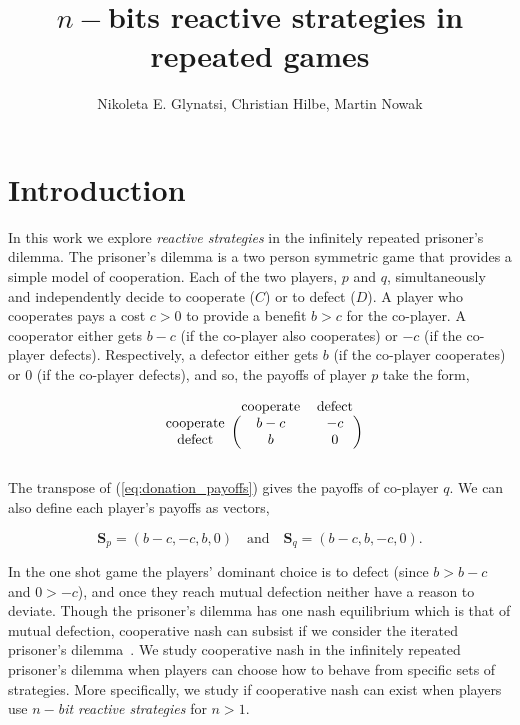 \documentclass{article}
\title{$n-$bits reactive strategies in repeated games}
\author{Nikoleta E. Glynatsi, Christian Hilbe, Martin Nowak}
\date{}
\theoremstyle{definition}
\begin{document}
\maketitle

\section{Introduction}

In this work we explore \textit{reactive strategies} in the infinitely repeated
prisoner's dilemma. The prisoner's dilemma is a two person symmetric game that
provides a simple model of cooperation. Each of the two players, \(p\) and
\(q\), simultaneously and independently decide to cooperate (\(C\)) or to defect
(\(D\)). A player who cooperates pays a cost \(c > 0\) to provide a benefit
\(b > c\) for the co-player. A cooperator either gets \(b - c\) (if the
co-player also cooperates) or \(-c\) (if the co-player defects). Respectively, a defector either gets
\(b\) (if the co-player cooperates) or 0 (if the co-player defects), and so,
the payoffs of player \(p\) take the form,

\begin{equation}\label{eq:donation_payoffs}
  \begin{blockarray}{ccc}
      & \text{cooperate} & \text{defect} \\
      \begin{block}{c(cc)}
          \text{cooperate} & b - c & -c \\
          \text{defect} & b & 0 \\
      \end{block}
  \end{blockarray}
\end{equation}

The transpose of (\ref{eq:donation_payoffs}) gives the payoffs of
co-player \(q\). We can also define each player's payoffs as vectors,

\begin{equation}\label{eq:vector_payoffs}
  \mathbf{S}_{p} = (b-c, -c, b, 0) \quad \textrm{and} \quad  \mathbf{S}_{q} = (b - c, b, -c, 0).
\end{equation}

In the one shot game the players' dominant choice is to defect (since $b > b -
c$ and $0 > -c$), and once they reach mutual defection neither have a reason to
deviate. Though the prisoner's dilemma has one nash equilibrium which is that of mutual
defection, cooperative nash can subsist if we consider the iterated prisoner's
dilemma~\citep{axelrod:AAAS:1981, hilbe:PNAS:2017}. We study cooperative nash in the infinitely
repeated prisoner's dilemma when players can choose how to behave from specific
sets of strategies. More specifically, we study if cooperative nash can exist
when players use \textit{\(n-\)bit reactive strategies} for $n > 1$.
\end{document}
